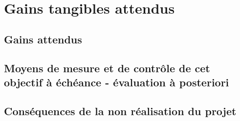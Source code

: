 \chapter{Gains tangibles attendus}

\section{Gains attendus}

\section{Moyens de mesure et de contrôle de cet objectif à échéance - évaluation à posteriori}

\section{Conséquences de la non réalisation du projet}